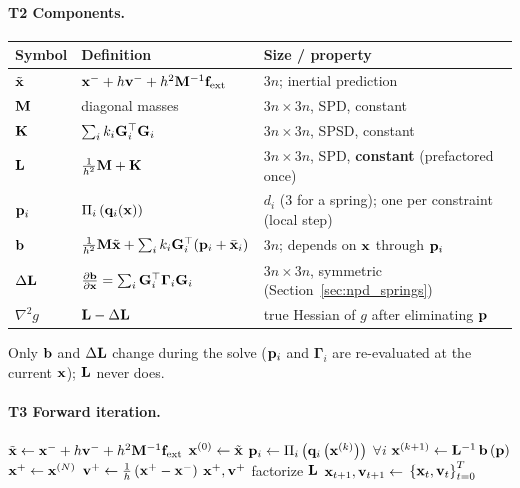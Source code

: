 \paragraph{T2 Components.}\mbox{}
\begin{center}
\renewcommand{\arraystretch}{1.4}
\begin{tabular}{lll}
\textbf{Symbol} & \textbf{Definition} & \textbf{Size / property} \\ \hline
$\tilde{\mathbf{x}}$   & $\mathbf{x}^- + h\mathbf{v}^- + h^2\mathbf{M}^{-1}\mathbf{f}_{\text{ext}}$ & $3n$; inertial prediction \\
$\mathbf{M}$         & diagonal masses                             & $3n\times 3n$, SPD, constant \\
$\mathbf{K}$        & $\sum_i k_i\mathbf{G}_i^\top\mathbf{G}_i$                   & $3n\times 3n$, SPSD, constant \\
$\mathbf{L}$        & $\tfrac{1}{h^2}\mathbf{M} + \mathbf{K}$                    & $3n\times 3n$, SPD, \textbf{constant} (prefactored once) \\
$\mathbf{p}_i$       & $\Pi_i\left(\mathbf{q}_i(\mathbf{x})\right)$   & $d_i$ ($3$ for a spring); one per constraint (local step) \\
$\mathbf{b}$        & $\tfrac{1}{h^2}\mathbf{M}\tilde{\mathbf{x}} + \sum_i k_i\mathbf{G}_i^\top(\mathbf{p}_i + \bar{\mathbf{x}}_i)$ & $3n$; depends on $\mathbf{x}$ through $\mathbf{p}_i$ \\
$\Delta\mathbf{L}$  & $\frac{\partial \mathbf{b}}{\partial \mathbf{x}} = \sum_i\mathbf{G}_i^\top\boldsymbol{\Gamma}_i\mathbf{G}_i$ & $3n\times 3n$, symmetric (Section~\ref{sec:npd_springs}) \\
$\nabla^2 g$ & $\mathbf{L} - \Delta\mathbf{L}$                           & true Hessian of $g$ after eliminating $\mathbf{p}$ \\
\end{tabular}
\end{center}
\noindent Only $\mathbf{b}$ and $\Delta\mathbf{L}$ change during the solve ($\mathbf{p}_i$ and $\boldsymbol{\Gamma}_i$ are re-evaluated at the current $\mathbf{x}$); $\mathbf{L}$ never does.
\paragraph{T3 Forward iteration.}\mbox{}
\begin{algorithm}[H]
\caption{V1: one PD step and the full simulation.}
\label{alg:npd_v1}
\begin{algorithmic}[1]
    \State $\tilde{\mathbf{x}} \gets \mathbf{x}^- + h\mathbf{v}^- + h^2\mathbf{M}^{-1}\mathbf{f}_{\text{ext}}$
    \State $\mathbf{x}^{(0)} \gets \tilde{\mathbf{x}}$
        \State $\mathbf{p}_i \gets \Pi_i\left(\mathbf{q}_i\left(\mathbf{x}^{(k)}\right)\right)$ \quad $\forall i$ 
        \State $\mathbf{x}^{(k+1)} \gets \mathbf{L}^{-1}\,\mathbf{b}\left(\mathbf{p}\right)$ 
    \EndFor
    \State $\mathbf{x}^+ \gets \mathbf{x}^{(N)}$
    \State $\mathbf{v}^+ \gets \tfrac{1}{h}\left(\mathbf{x}^+ - \mathbf{x}^-\right)$
    \State \Return $\mathbf{x}^+, \mathbf{v}^+$
\EndFunction
\Statex
{}
    \State factorize $\mathbf{L}$ 
        \State $\mathbf{x}_{t+1}, \mathbf{v}_{t+1} \gets$ 
    \EndFor
    \State \Return $\left\{\mathbf{x}_t, \mathbf{v}_t\right\}_{t=0}^{T}$ 
\EndFunction
\end{algorithmic}
\end{algorithm}
